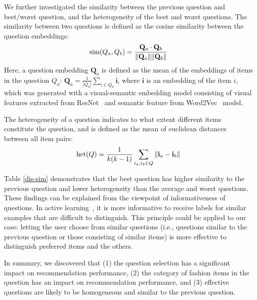 We further investigated the similarity between the previous question and best/worst question,
and the heterogeneity of the best and worst questions.
The similarity between two questions is defined as the cosine similarity between the question embeddings:
\begin{eqnarray}
{\rm sim}(Q_a, Q_b) = \frac{\mathbf{Q}_{a} \cdot \mathbf{Q}_{b}}{\|\mathbf{Q}_{a}\|\|\mathbf{Q}_{b}\|}
\label{eq:sim}
\end{eqnarray}
Here, a question embedding $\mathbf{Q}_{a}$ is defined as the mean of the embeddings of items in the question $Q_a$:
$\mathbf{Q}_a = \frac{1}{|Q_a|} \sum_{i \in Q_a} \mathbf{i}$,
where $\mathbf{i}$ is an embedding of the item $i$,
which was generated with a visual-semantic embedding model consisting of visual features extracted from ResNet~\cite{he2016deep} and semantic feature from Word2Vec~\cite{mikolov2013efficient} model.

The heterogeneity of a question indicates to what extent different items constitute the question,
and is defined as the mean of euclidean distances between all item pairs:
\begin{eqnarray}
{\rm het}(Q) = \frac{1}{k(k-1)} \sum_{i_a, i_b \in Q} \| \mathbf{i}_a - \mathbf{i}_b \| 
\end{eqnarray}

Table \ref{dis-sim} demonstrates that the best question has higher similarity to the previous question and lower heterogeneity than the average and worst questions.
These findings can be explained from the viewpoint of informativeness of questions.
In active learning~\cite{settles2009active}, 
it is more informative to receive labels for similar examples that are difficult to distinguish. 
This principle could be applied to our case: letting the user choose from similar questions
(i.e., questions similar to the previous question or those consisting of similar items) is more effective to distinguish preferred items and the others.


In summary, we discovered that (1) the question selection has a significant impact on recommendation performance, (2) the category of fashion items in the question has an impact on recommendation performance,
and (3) effective questions are likely to be homogeneous and similar to the previous question. 
